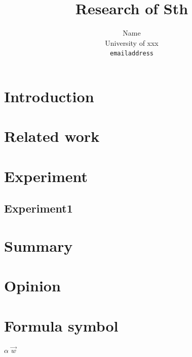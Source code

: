 \documentclass[12pt,twocolumn,letterpaper]{article}
\begin{document}
 

\title{Research of Sth}

\author{
Name\\
University of xxx\\
{\tt\small emailaddress}
}

\maketitle

\begin{abstract}

   
\end{abstract}

\section{Introduction}



\section{Related work}

\section{Experiment}
\subsection{Experiment1}



\section{Summary}

\section{Opinion}


\section{Formula symbol}
$\alpha$   $\vec{w}$ 
\end{document}
